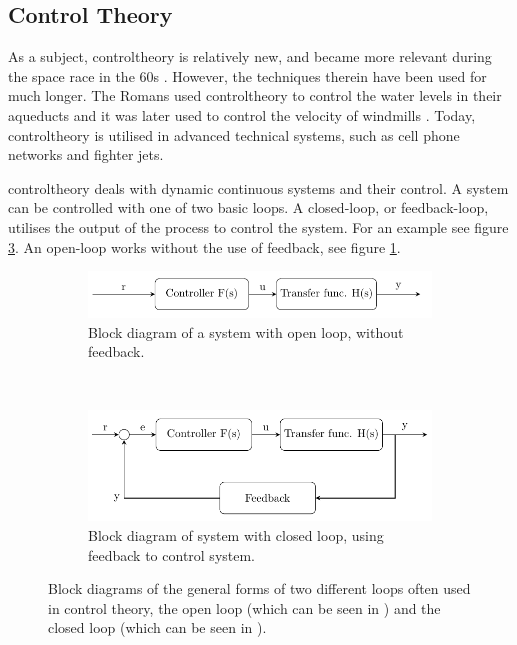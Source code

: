\subsection{Control Theory}
As a subject, \gls{controltheory} is relatively new, and became more relevant during the space race in the 60s \cite{lennartson_2000}. However, the techniques therein have been used for much longer. The Romans used \gls{controltheory} to control the water levels in their aqueducts and it was later used to control the velocity of windmills \cite{ControlTheoryHistory}. Today, \gls{controltheory} is utilised in advanced technical systems, such as cell phone networks and fighter jets.

\Gls{controltheory} deals with dynamic continuous systems and their control. 
A system can be controlled with one of two basic loops. A closed-loop, or feedback-loop, utilises the output of the process to control the system. For an example see figure \ref{fig:closedloop}. An open-loop works without the use of feedback, see figure \ref{fig:openloop}.%

\begin{figure}[H]
\begin{subfigure}[t]{0.999\linewidth}
    \centering
    \includegraphics[width=1.0\linewidth]{Theory/nofeedback1.PNG}
    \caption{Block diagram of a system with open loop, without feedback.}
    \label{fig:openloop}\vspace{.4cm}
\end{subfigure}\\
\begin{subfigure}[t]{0.999\linewidth}
    \centering
    \includegraphics[width=0.999\linewidth]{Theory/feedback1.PNG}
    \caption{Block diagram of system with closed loop, using feedback to control system.}
    \label{fig:closedloop}
\end{subfigure}
\caption{Block diagrams of the general forms of two different loops often used in control theory, the open loop (which can be seen in ) and the closed loop (which can be seen in ).}
\end{figure}
\noindent

